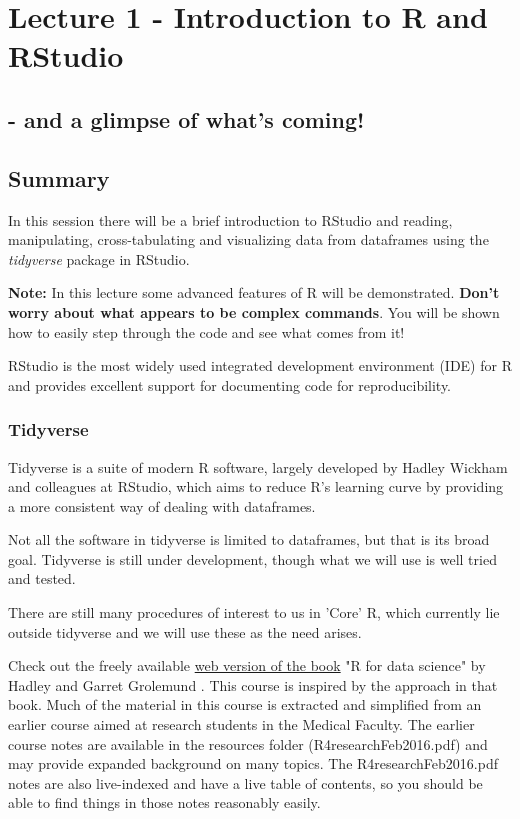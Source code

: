 \documentclass[titlepage]{book}\usepackage{knitr}
\begin{document}
\chapter{Lecture 1 - Introduction to R and RStudio }\label{L1}
\section*{- and a glimpse of what's coming!}

\author{Brian Williams $<$\href{mailto:bjw649@gmail.com}%
{bjw649@gmail.com}$>$}

\section{Summary}
In this session there will be a brief introduction to RStudio and reading, manipulating, cross-tabulating and visualizing data from dataframes using the \emph{tidyverse} package in RStudio.

\textbf{Note:} In this lecture some advanced features of R will be demonstrated. \textbf{Don't worry about what appears to be complex commands}. You will be shown how to easily step through the code and see what comes from it! 

RStudio is the most widely used integrated development environment (IDE) for R and provides excellent support for documenting code for reproducibility.

\subsection{Tidyverse}
Tidyverse is a suite of modern R software, largely developed by Hadley Wickham and colleagues at RStudio, which aims to reduce R's learning curve by providing a more consistent way of dealing with dataframes. 

Not all the software in tidyverse is limited to dataframes, but that is its broad goal.   Tidyverse is still under development, though what we will use is well tried and tested. 

There are still many procedures of interest to us in 'Core' R, which currently lie outside tidyverse and we will use these as the need arises. 

Check out the freely available \href{https://r4ds.had.co.nz/index.html}{web version of the book} "R for data science" by Hadley and Garret Grolemund \cite{Wickham2016}. This course is inspired by the approach in that book.  Much of the material in this course is extracted and simplified from an earlier course aimed at research students in the Medical Faculty. The earlier course notes are available in the resources folder (R4researchFeb2016.pdf) and may provide expanded background on many topics. The R4researchFeb2016.pdf notes are also live-indexed and have a live table of contents, so you should be able to find things in those notes reasonably easily.
\end{document}
